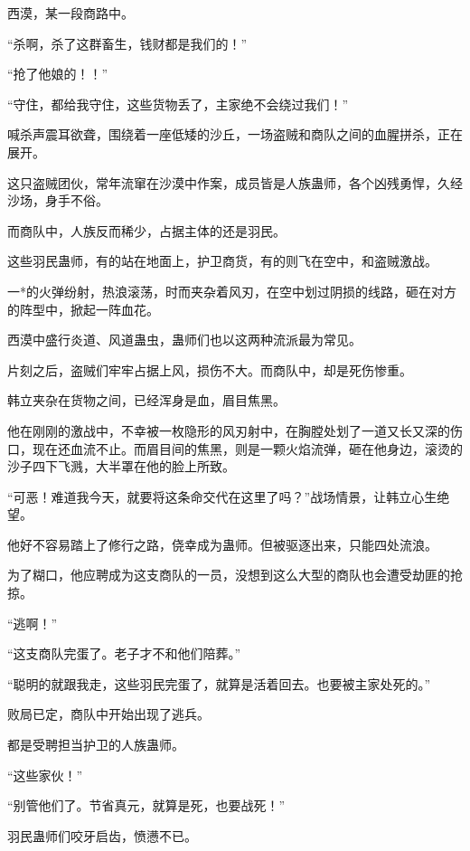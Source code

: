 
\begin{this_body}

西漠，某一段商路中。

“杀啊，杀了这群畜生，钱财都是我们的！”

“抢了他娘的！！”

“守住，都给我守住，这些货物丢了，主家绝不会绕过我们！”

喊杀声震耳欲聋，围绕着一座低矮的沙丘，一场盗贼和商队之间的血腥拼杀，正在展开。

这只盗贼团伙，常年流窜在沙漠中作案，成员皆是人族蛊师，各个凶残勇悍，久经沙场，身手不俗。

而商队中，人族反而稀少，占据主体的还是羽民。

这些羽民蛊师，有的站在地面上，护卫商货，有的则飞在空中，和盗贼激战。

一*的火弹纷射，热浪滚荡，时而夹杂着风刃，在空中划过阴损的线路，砸在对方的阵型中，掀起一阵血花。

西漠中盛行炎道、风道蛊虫，蛊师们也以这两种流派最为常见。

片刻之后，盗贼们牢牢占据上风，损伤不大。而商队中，却是死伤惨重。

韩立夹杂在货物之间，已经浑身是血，眉目焦黑。

他在刚刚的激战中，不幸被一枚隐形的风刃射中，在胸膛处划了一道又长又深的伤口，现在还血流不止。而眉目间的焦黑，则是一颗火焰流弹，砸在他身边，滚烫的沙子四下飞溅，大半罩在他的脸上所致。

“可恶！难道我今天，就要将这条命交代在这里了吗？”战场情景，让韩立心生绝望。

他好不容易踏上了修行之路，侥幸成为蛊师。但被驱逐出来，只能四处流浪。

为了糊口，他应聘成为这支商队的一员，没想到这么大型的商队也会遭受劫匪的抢掠。

“逃啊！”

“这支商队完蛋了。老子才不和他们陪葬。”

“聪明的就跟我走，这些羽民完蛋了，就算是活着回去。也要被主家处死的。”

败局已定，商队中开始出现了逃兵。

都是受聘担当护卫的人族蛊师。

“这些家伙！”

“别管他们了。节省真元，就算是死，也要战死！”

羽民蛊师们咬牙启齿，愤懑不已。


\end{this_body}
